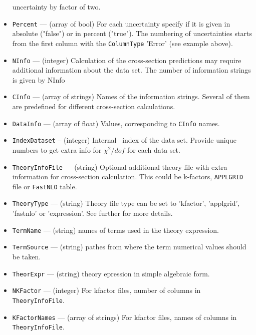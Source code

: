 \begin{itemize}
                      uncertainty by factor of two.                       
      \item {\tt Percent}     --- (array of bool) For each uncertainty specify if it is given in 
                      absolute ("false") or in percent ("true").  The numbering of 
                      uncertainties starts from the first column with the 
                      {\tt ColumnType} 'Error' (see example above).
      \item {\tt NInfo}       --- (integer) Calculation of the cross-section predictions may 
                      require  additional information about the data set. The number of 
                      information strings is given by NInfo
      \item {\tt CInfo}       --- (array of strings) Names of the information strings. 
                      Several of them are predefined for different cross-section 
                      calculations.
      \item {\tt DataInfo}    --- (array of float) Values, corresponding to {\tt CInfo} names.
      \item {\tt IndexDataset} -- (integer) Internal \fitter\ index of the data set. Provide unique
                      numbers to get extra info for $\chi^2/dof$ for each data set.      
      \item {\tt TheoryInfoFile} --- (string) Optional additional theory file with extra 
                     information for cross-section calculation. This could be k-factors,
                     {\tt APPLGRID} file or {\tt FastNLO} table.  
      \item {\tt TheoryType} --- (string) Theory file type can be set to
		     'kfactor', 'applgrid', 'fastnlo' or 'expression'. See further for more
		     details.
      \item {\tt TermName} --- (string) names of terms used in the theory expression.
      \item {\tt TermSource} --- (string) pathes from where the term numerical values should be taken.
      \item {\tt TheorExpr} --- (string) theory epression in simple algebraic form.
      \item {\tt NKFactor}   --- (integer) For kfactor files, number of columns in
                     {\tt TheoryInfoFile}.
      \item {\tt KFactorNames} --- (array of strings) For kfactor files, names of columns in 
                     {\tt TheoryInfoFile}.
\end{itemize}


